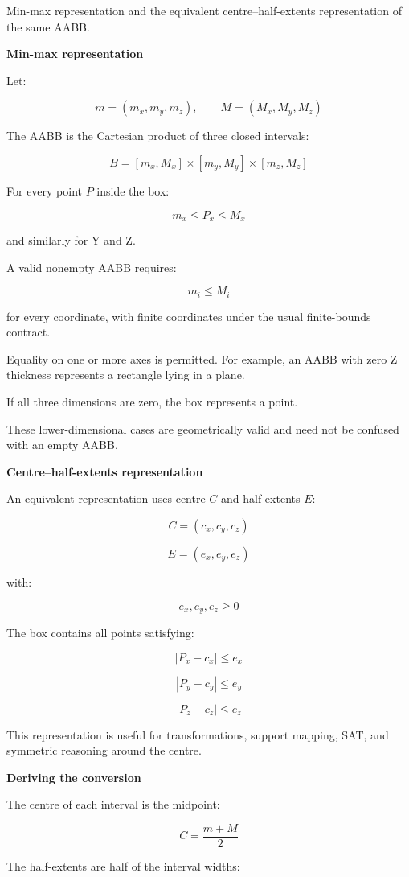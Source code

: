 Min-max representation and the equivalent centre--half-extents representation of the same AABB.

\textbf{Min-max representation}

Let:

\[
m=(m_x,m_y,m_z),\qquad M=(M_x,M_y,M_z)
\]

The AABB is the Cartesian product of three closed intervals:

\[
\boxed{ B=[m_x,M_x]\times[m_y,M_y]\times[m_z,M_z] }
\]

For every point \(P\) inside the box:

\[
m_x\le P_x\le M_x
\]

and similarly for Y and Z.

A valid nonempty AABB requires:

\[
m_i\le M_i
\]

for every coordinate, with finite coordinates under the usual finite-bounds contract.

Equality on one or more axes is permitted. For example, an AABB with zero Z thickness represents a rectangle lying in a plane.

If all three dimensions are zero, the box represents a point.

These lower-dimensional cases are geometrically valid and need not be confused with an empty AABB.

\textbf{Centre--half-extents representation}

An equivalent representation uses centre \(C\) and half-extents \(E\):

\[
C=(c_x,c_y,c_z)
\]

\[
E=(e_x,e_y,e_z)
\]

with:

\[
e_x,e_y,e_z\ge0
\]

The box contains all points satisfying:

\[
|P_x-c_x|\le e_x
\]

\[
|P_y-c_y|\le e_y
\]

\[
|P_z-c_z|\le e_z
\]

This representation is useful for transformations, support mapping, SAT, and symmetric reasoning around the centre.

\textbf{Deriving the conversion}

The centre of each interval is the midpoint:

\[
\boxed{C=\frac{m+M}{2}}
\]

The half-extents are half of the interval widths:

